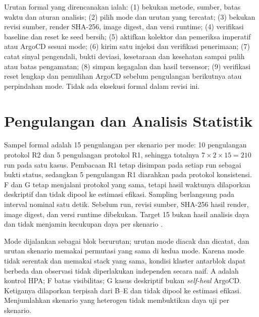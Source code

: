 Urutan formal yang direncanakan ialah: (1) bekukan metode, sumber, batas waktu dan aturan analisis; (2) pilih mode dan urutan yang tercatat; (3) bekukan revisi sumber, render SHA-256, image digest, dan versi runtime; (4) verifikasi baseline dan reset ke seed bersih; (5) aktifkan kolektor dan pemeriksa imperatif atau ArgoCD sesuai mode; (6) kirim satu injeksi dan verifikasi penerimaan; (7) catat sinyal pengendali, bukti deviasi, kesetaraan dan kesehatan sampai pulih atau batas pengamatan; (8) simpan kegagalan dan hasil tersensor; (9) verifikasi reset lengkap dan pemulihan ArgoCD sebelum pengulangan berikutnya atau perpindahan mode. Tidak ada eksekusi formal dalam revisi ini.

\section{Pengulangan dan Analisis Statistik}

Sampel formal adalah 15 pengulangan per skenario per mode: 10 pengulangan protokol R2 dan 5 pengulangan protokol R1, sehingga totalnya $7 \times 2 \times 15 = 210$ run pada satu kasus. Pembacaan R1 tetap disimpan pada setiap run sebagai bukti status, sedangkan 5 pengulangan R1 diarahkan pada protokol konsistensi. F dan G tetap menjalani protokol yang sama, tetapi hasil waktunya dilaporkan deskriptif dan tidak dipool ke estimasi efikasi. Sampling berlangsung pada interval nominal satu detik. Sebelum run, revisi sumber, SHA-256 hasil render, image digest, dan versi runtime dibekukan. Target 15 bukan hasil analisis daya dan tidak menjamin kecukupan daya per skenario \citep{dyba2006power,kitchenham2024small,cohen1988statistical}.

Mode dijalankan sebagai blok berurutan; urutan mode diacak dan dicatat, dan urutan skenario memakai permutasi yang sama di kedua mode. Karena mode tidak serentak dan memakai stack yang sama, kondisi klaster antarblok dapat berbeda dan observasi tidak diperlakukan independen secara naif. A adalah kontrol HPA; F batas visibilitas; G kasus deskriptif bukan \textit{self-heal} ArgoCD. Ketiganya dilaporkan terpisah dari B--E dan tidak dipool ke estimasi efikasi. Menjumlahkan skenario yang heterogen tidak membuktikan daya uji per skenario.

